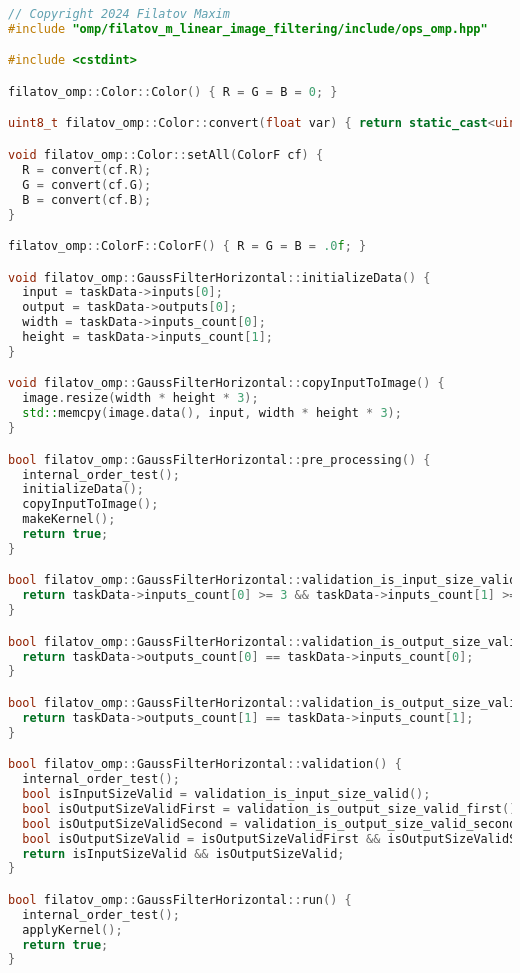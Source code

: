 \documentclass{report}
\begin{document}
\newpage

\begin{lstlisting}[language=C++,caption=OpenMP версия]
// Copyright 2024 Filatov Maxim
#include "omp/filatov_m_linear_image_filtering/include/ops_omp.hpp"

#include <cstdint>

filatov_omp::Color::Color() { R = G = B = 0; }

uint8_t filatov_omp::Color::convert(float var) { return static_cast<uint8_t>(std::ceil(var)); }

void filatov_omp::Color::setAll(ColorF cf) {
  R = convert(cf.R);
  G = convert(cf.G);
  B = convert(cf.B);
}

filatov_omp::ColorF::ColorF() { R = G = B = .0f; }

void filatov_omp::GaussFilterHorizontal::initializeData() {
  input = taskData->inputs[0];
  output = taskData->outputs[0];
  width = taskData->inputs_count[0];
  height = taskData->inputs_count[1];
}

void filatov_omp::GaussFilterHorizontal::copyInputToImage() {
  image.resize(width * height * 3);
  std::memcpy(image.data(), input, width * height * 3);
}

bool filatov_omp::GaussFilterHorizontal::pre_processing() {
  internal_order_test();
  initializeData();
  copyInputToImage();
  makeKernel();
  return true;
}

bool filatov_omp::GaussFilterHorizontal::validation_is_input_size_valid() {
  return taskData->inputs_count[0] >= 3 && taskData->inputs_count[1] >= 3;
}

bool filatov_omp::GaussFilterHorizontal::validation_is_output_size_valid_first() {
  return taskData->outputs_count[0] == taskData->inputs_count[0];
}

bool filatov_omp::GaussFilterHorizontal::validation_is_output_size_valid_second() {
  return taskData->outputs_count[1] == taskData->inputs_count[1];
}

bool filatov_omp::GaussFilterHorizontal::validation() {
  internal_order_test();
  bool isInputSizeValid = validation_is_input_size_valid();
  bool isOutputSizeValidFirst = validation_is_output_size_valid_first();
  bool isOutputSizeValidSecond = validation_is_output_size_valid_second();
  bool isOutputSizeValid = isOutputSizeValidFirst && isOutputSizeValidSecond;
  return isInputSizeValid && isOutputSizeValid;
}

bool filatov_omp::GaussFilterHorizontal::run() {
  internal_order_test();
  applyKernel();
  return true;
}


\end{lstlisting}
\end{document}
